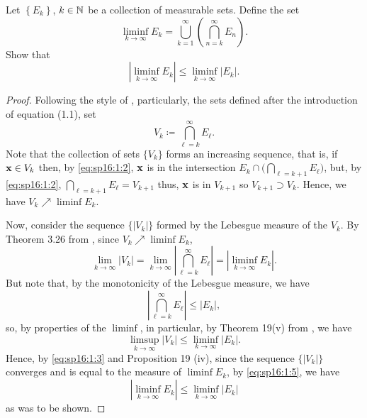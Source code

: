 \begin{problem}
Let $\left\{ E_k \right\}$, $k\in\mathbb{N}$ be a collection of measurable
sets. Define the set
\[
\liminf_{k\to\infty} E_k
=\bigcup_{k=1}^\infty\left(\bigcap_{n=k}^\infty E_n\right).
\]
Show that
\[
\left|\liminf_{k\to\infty} E_k\right|\leq\liminf_{k\to\infty}\left|E_k\right|.
\]
\end{problem}
\begin{proof}
Following the style of \cite[\S 1.1, p.\@ 2]{wheeden-zygmund},
particularly, the sets defined after the introduction of equation (1.1),
set
\begin{equation}
\label{eq:sp16:1:2}
V_k\coloneqq\bigcap_{\ell=k}^\infty E_\ell.
\end{equation}
Note that the collection of sets $\{V_k\}$ forms an increasing
sequence, that is, if $\mathbf{x}\in V_k$ then, by \eqref{eq:sp16:1:2}, $\mathbf{x}$ is
in the intersection $E_k\cap\bigl(\bigcap_{\ell=k+1}E_\ell\bigr)$, but, by
\eqref{eq:sp16:1:2}, $\bigcap_{\ell=k+1}E_\ell=V_{k+1}$ thus, $\mathbf{x}$
is in $V_{k+1}$ so $V_{k+1}\supset V_k$. Hence, we have $V_k\nearrow\liminf
E_k$.

Now, consider the sequence $\{|V_k|\}$ formed by the Lebesgue measure of
the $V_k$. By Theorem 3.26 from \cite[\S 3.3, p.\@
51]{wheeden-zygmund}, since $V_k\nearrow\liminf E_k$,
\begin{equation}
  \label{eq:sp16:1:3}
\lim_{k\to\infty}|V_k|=
\lim_{k\to\infty}\left|\bigcap_{\ell=k}^\infty E_\ell\right|=
\left|\liminf_{k\to\infty} E_k\right|.
\end{equation}
But note that, by the monotonicity of the Lebesgue measure, we have
\begin{equation}
  \label{eq:sp16:1:4}
\left|\bigcap_{\ell=k}^\infty E_\ell\right|\leq |E_k|,
\end{equation}
so, by properties of the $\liminf$, in particular, by Theorem 19(v) from
\cite[\S 1.5, p.\@ 23]{royden}, we have
\begin{equation}
\label{eq:sp16:1:5}
\limsup_{k\to\infty}|V_k|\leq\liminf_{k\to\infty}|E_k|.
\end{equation}
Hence, by \eqref{eq:sp16:1:3} and Proposition 19 (iv), since the sequence
$\{|V_k|\}$ converges and is equal to the measure of $\liminf E_k$, by
\eqref{eq:sp16:1:5}, we have
\begin{equation}
\label{eq:sp16:1:6}
\left|\liminf_{k\to\infty} E_k\right|\leq\liminf_{k\to\infty}|E_k|
\end{equation}
as was to be shown.
\end{proof}

